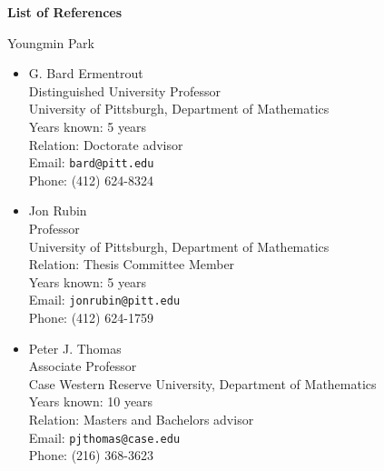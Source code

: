 \documentclass[a4paper,11pt]{article}
\begin{document}
\begin{center}
\Large \textbf{List of References}

\Large Youngmin Park
\end{center}

\begin{itemize}
 \item G. Bard Ermentrout\\
 Distinguished University Professor\\
 University of Pittsburgh, Department of Mathematics\\
 Years known: 5 years\\
 Relation: Doctorate advisor\\
 Email: \texttt{bard@pitt.edu}\\
 Phone: (412) 624-8324
 \item Jon Rubin\\
 Professor\\
 University of Pittsburgh, Department of Mathematics\\
 Relation: Thesis Committee Member\\
 Years known: 5 years\\
 Email: \texttt{jonrubin@pitt.edu}\\
 Phone: (412) 624-1759
 \item Peter J. Thomas\\
 Associate Professor\\
 Case Western Reserve University, Department of Mathematics\\
 Years known: 10 years\\
 Relation: Masters and Bachelors advisor\\
 Email: \texttt{pjthomas@case.edu}\\
 Phone: (216) 368-3623
\end{itemize}
\end{document}
